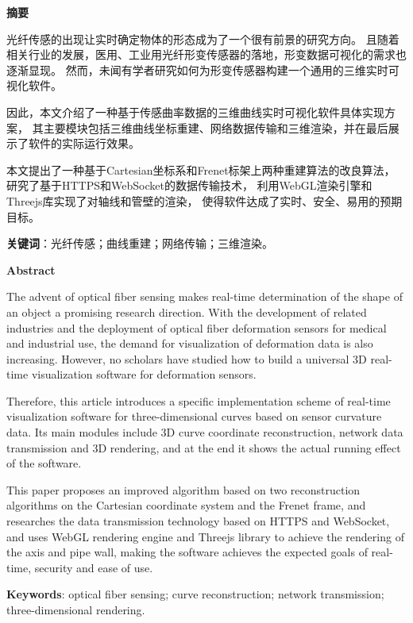 \clearpage
\begin{center}
    \bfseries {} 摘要
\end{center}

光纤传感的出现让实时确定物体的形态成为了一个很有前景的研究方向。
且随着相关行业的发展，医用、工业用光纤形变传感器的落地，形变数据可视化的需求也逐渐显现。
然而，未闻有学者研究如何为形变传感器构建一个通用的三维实时可视化软件。

因此，本文介绍了一种基于传感曲率数据的三维曲线实时可视化软件具体实现方案，
其主要模块包括三维曲线坐标重建、网络数据传输和三维渲染，并在最后展示了软件的实际运行效果。

本文提出了一种基于Cartesian坐标系和Frenet标架上两种重建算法的改良算法，
研究了基于HTTPS和WebSocket的数据传输技术，
利用WebGL渲染引擎和Threejs库实现了对轴线和管壁的渲染，
使得软件达成了实时、安全、易用的预期目标。

\textbf{关键词}：光纤传感；曲线重建；网络传输；三维渲染。

\clearpage

\begin{center}
    \bfseries {} Abstract
\end{center}

The advent of optical fiber sensing makes real-time determination of the shape of an object a promising research direction.
With the development of related industries and the deployment of optical fiber deformation sensors for medical and industrial use, the demand for visualization of deformation data is also increasing.
However, no scholars have studied how to build a universal 3D real-time visualization software for deformation sensors.

Therefore, this article introduces a specific implementation scheme of real-time visualization software for three-dimensional curves based on sensor curvature data.
Its main modules include 3D curve coordinate reconstruction, network data transmission and 3D rendering, and at the end it shows the actual running effect of the software.

This paper proposes an improved algorithm based on two reconstruction algorithms on the Cartesian coordinate system and the Frenet frame,
and researches the data transmission technology based on HTTPS and WebSocket,
and uses WebGL rendering engine and Threejs library to achieve the rendering of the axis and pipe wall,
making the software achieves the expected goals of real-time, security and ease of use.

\textbf{Keywords}: optical fiber sensing; curve reconstruction; network transmission; three-dimensional rendering.